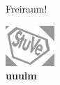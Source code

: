 
{

\thispagestyle{empty}
\null\vfill
\begin{center}
	Freiraum!
\end{center}
\clearpage
\thispagestyle{empty}
\null
\vspace{16.5cm}
\begin{center}
	\includegraphics[keepaspectratio, width=5em]{./grafiken/stuve_logo_gedreht-leicht_grau.png}\\
	\textcolor{black!40}{\large \textbf{uuulm}}
\end{center}

}